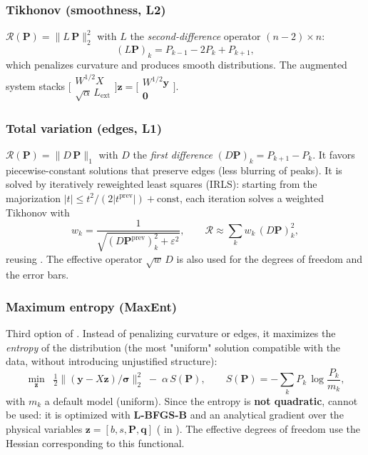\subsubsection{Tikhonov (smoothness, L2)}
$\mathcal R(\bm P)=\lVert L\,\bm P\rVert_2^2$ with $L$ the \emph{second-difference}
operator $(n-2)\times n$:
\begin{equation}
  (L\bm P)_k = P_{k-1}-2P_k+P_{k+1},
\end{equation}
which penalizes curvature and produces smooth distributions. The augmented system
stacks $\bigl[\begin{smallmatrix}W^{1/2}X\\ \sqrt\alpha\,L_{\text{ext}}\end{smallmatrix}\bigr]\bm z = \bigl[\begin{smallmatrix}W^{1/2}\bm y\\ \bm 0\end{smallmatrix}\bigr]$.

\subsubsection{Total variation (edges, L1)}
$\mathcal R(\bm P)=\lVert D\,\bm P\rVert_1$ with $D$ the \emph{first difference}
$(D\bm P)_k=P_{k+1}-P_k$. It favors piecewise-constant solutions that preserve
edges (less blurring of peaks). It is solved by iteratively reweighted least
squares (IRLS): starting from the majorization
$|t|\le t^2/(2|t^{\text{prev}}|)+\text{const}$, each iteration solves a weighted
Tikhonov with
\begin{equation}
  w_k = \frac{1}{\sqrt{(D\bm P^{\text{prev}})_k^2+\varepsilon^2}},
  \qquad \mathcal R\approx \sum_k w_k\,(D\bm P)_k^2,
\end{equation}
reusing . The effective operator $\sqrt{w}\,D$ is also used for
the degrees of freedom and the error bars.

\subsubsection{Maximum entropy (MaxEnt)}
Third option of . Instead of penalizing curvature or edges, it
maximizes the \emph{entropy} of the distribution (the most "uniform" solution
compatible with the data, without introducing unjustified structure):
\begin{equation}
  \min_{\bm z}\;\;\tfrac12\bigl\lVert (\bm y-X\bm z)/\bm\sigma\bigr\rVert_2^2
  \;-\; \alpha\,S(\bm P),\qquad
  S(\bm P) = -\sum_k P_k\,\log\!\frac{P_k}{m_k},
\end{equation}
with $m_k$ a default model (uniform). Since the entropy is \textbf{not quadratic},
 cannot be used: it is optimized with \textbf{L-BFGS-B} and an
analytical gradient over the physical variables $\bm z=[b,s,\bm P,\bm q]$
( in ). The effective degrees
of freedom use the Hessian corresponding to this functional.

